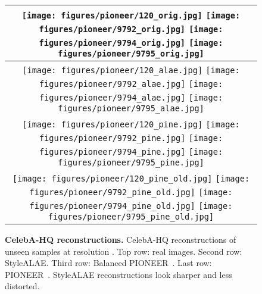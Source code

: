 \begin{figure}[t]
\begin{tabular}{c}
\texttt{[image: figures/pioneer/120\_orig.jpg]}
\texttt{[image: figures/pioneer/9792\_orig.jpg]}
\texttt{[image: figures/pioneer/9794\_orig.jpg]}
\texttt{[image: figures/pioneer/9795\_orig.jpg]}\\
\midrule
\texttt{[image: figures/pioneer/120\_alae.jpg]}
\texttt{[image: figures/pioneer/9792\_alae.jpg]}
\texttt{[image: figures/pioneer/9794\_alae.jpg]}
\texttt{[image: figures/pioneer/9795\_alae.jpg]}\\
\texttt{[image: figures/pioneer/120\_pine.jpg]}
\texttt{[image: figures/pioneer/9792\_pine.jpg]}
\texttt{[image: figures/pioneer/9794\_pine.jpg]}
\texttt{[image: figures/pioneer/9795\_pine.jpg]}\\
\texttt{[image: figures/pioneer/120\_pine\_old.jpg]}
\texttt{[image: figures/pioneer/9792\_pine\_old.jpg]}
\texttt{[image: figures/pioneer/9794\_pine\_old.jpg]}
\texttt{[image: figures/pioneer/9795\_pine\_old.jpg]}
\end{tabular}
\vspace{-3mm}
\caption{\textbf{CelebA-HQ reconstructions.} CelebA-HQ reconstructions of unseen samples at resolution . Top row: real images. Second row: StyleALAE. Third row: Balanced PIONEER~\cite{heljakka2019towards}. Last row: PIONEER~\cite{heljakka2018pioneer}. StyleALAE reconstructions look sharper and less distorted.}
\vspace{-4mm}
\label{f-ablation}
\end{figure}

  









